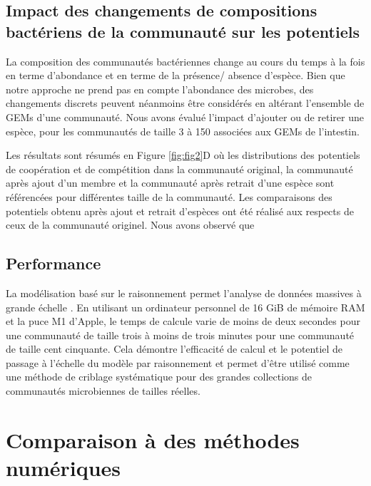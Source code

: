 \subsection{Impact des changements de compositions bactériens de la communauté sur les potentiels} La composition des communautés bactériennes change au cours du temps à la fois en terme d'abondance et en terme de la présence/ absence d'espèce. Bien que notre approche ne prend pas en compte l'abondance des microbes, des changements discrets peuvent néanmoins être considérés en altérant l'ensemble de GEMs d'une communauté. Nous avons évalué l'impact d'ajouter ou de retirer une espèce, pour les communautés de taille 3 à 150 associées aux GEMs de l'intestin.

Les résultats sont résumés en Figure \ref{fig:fig2}D où les distributions des potentiels de coopération et de compétition dans la communauté original, la communauté après ajout d'un membre et la communauté après retrait d'une espèce sont référencées pour différentes taille de la communauté. Les comparaisons des potentiels obtenu après ajout et retrait d'espèces ont été réalisé aux respects de ceux de la communauté originel. Nous avons observé que 

\subsection{Performance} La modélisation basé sur le raisonnement permet l'analyse de données massives à grande échelle \citep{Frioux2018}. En utilisant un ordinateur personnel de 16 GiB de mémoire RAM et la puce M1 d'Apple, le temps de calcule varie de moins de deux secondes pour une communauté de taille trois à moins de trois minutes pour une communauté de taille cent cinquante. Cela démontre l'efficacité de calcul et le potentiel de passage à l'échelle du modèle par raisonnement et permet d'être utilisé comme une méthode de criblage systématique pour des grandes collections de communautés microbiennes de tailles réelles.

\section{Comparaison à des méthodes numériques}

